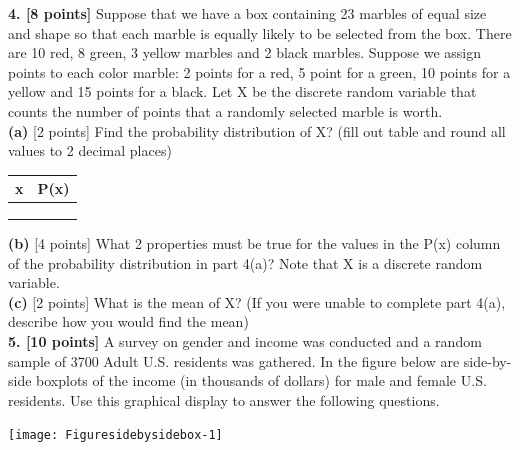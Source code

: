 \documentclass[11pt]{isuthesis}\usepackage[]{graphicx}\usepackage[]{color}
\newenvironment{knitrout}{}{} %
\begin{document}
\begin{appendices}

\textbf{4. [8 points]} Suppose that we have a box containing 23 marbles of equal size and shape so that each marble is equally likely to be selected from the box.  There are 10 red, 8 green, 3 yellow marbles and  2 black marbles.  Suppose we assign points to each color marble: 2 points for a red, 5 point for a green, 10 points for a yellow and 15 points for a black. Let X be the discrete random variable that counts the number of points that a randomly selected marble is worth.\\
\noindent\textbf{(a)} [2 points] Find the probability distribution of X? (fill out table and round all values to 2 decimal places)
\begin{table}[hbtp]\centering 
\begin{tabular}{ c|c }
x & P(x) \\
  \hline  
   &  \\
   &  \\
   &  \\  
\end{tabular}
\end{table}
\noindent\textbf{(b)} [4 points] What 2 properties must be true for the values in the P(x) column of the probability distribution in part 4(a)? Note that X is a discrete random variable.\\
\noindent\textbf{(c)} [2 points] What is the mean of X? (If you were unable to complete part 4(a), describe how you would find the mean) \\


\textbf{5. [10 points]} A survey on gender and income was conducted and a random sample of 3700 Adult U.S. residents was gathered. In the figure below are side-by-side boxplots of the income (in thousands of dollars) for male and female U.S. residents. Use this graphical display to answer the following questions.
\begin{knitrout}
\color{fgcolor}

{\centering \texttt{[image: Figuresidebysidebox-1]} 

}




\end{knitrout}
\end{appendices}
\end{document}

